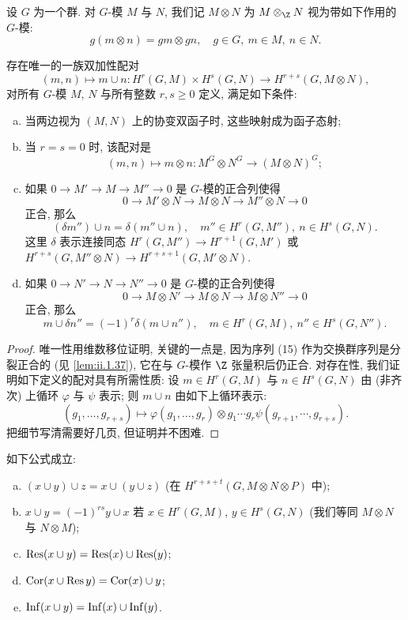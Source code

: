 设 $G$ 为一个群. 对 $G$-模 $M$ 与 $N$, 我们记 $M\otimes N$ 为 $M\otimes_\Z N$ 视为带如下作用的 $G$-模:
\[
 g(m\otimes n)=gm\otimes gn,\quad g\in G,\ m\in M,\ n\in N.
\]

\begin{proposition}\label{prop:ii.1.38}
存在唯一的一族双加性配对
\[
 (m,n)\mapsto m\cup n\colon H^r(G,M)\times H^s(G,N)\to H^{r+s}(G,M\otimes N),
\]
对所有 $G$-模 $M$, $N$ 与所有整数 $r,s\ge 0$ 定义, 满足如下条件:
\begin{enumerate}[(a)]
\item 当两边视为 $(M,N)$ 上的协变双函子时, 这些映射成为函子态射;
\item 当 $r=s=0$ 时, 该配对是
\[
 (m,n)\mapsto m\otimes n\colon M^G\otimes N^G\to (M\otimes N)^G;
\]
\item 如果 $0\to M'\to M\to M''\to 0$ 是 $G$-模的正合列使得
\[
 0\to M'\otimes N\to M\otimes N\to M''\otimes N\to 0
\]
正合, 那么
\[
 (\delta m'')\cup n=\delta(m''\cup n),\quad m''\in H^r(G,M''),\ n\in H^s(G,N).
\]
这里 $\delta$ 表示连接同态 $H^r(G,M'')\to H^{r+1}(G,M')$ 或 $H^{r+s}(G,M''\otimes N)\to H^{r+s+1}(G,M'\otimes N)$.
\item 如果 $0\to N'\to N\to N''\to 0$ 是 $G$-模的正合列使得
\[
 0\to M\otimes N'\to M\otimes N\to M\otimes N''\to 0
\]
正合, 那么
\[
 m\cup \delta n''=(-1)^r\delta(m\cup n''),\quad m\in H^r(G,M),\ n''\in H^s(G,N'').
\]
\end{enumerate}
\end{proposition}

\begin{proof}
唯一性用维数移位证明, 关键的一点是, 因为序列 (15) 作为交换群序列是分裂正合的 (见 \ref{lem:ii.1.37}), 它在与 $G$-模作 $\Z$ 张量积后仍正合. 对存在性, 我们证明如下定义的配对具有所需性质: 设 $m\in H^r(G,M)$ 与 $n\in H^s(G,N)$ 由 (非齐次) 上循环 $\varphi$ 与 $\psi$ 表示; 则 $m\cup n$ 由如下上循环表示:
\[
 (g_1,\ldots,g_{r+s})\mapsto \varphi(g_1,\ldots,g_r)\otimes g_1\cdots g_r\psi(g_{r+1},\cdots,g_{r+s}).
\]
把细节写清需要好几页, 但证明并不困难.
\end{proof}

\begin{proposition}\label{prop:ii.1.39}
如下公式成立:
\begin{enumerate}[(a)]
\item $(x\cup y)\cup z=x\cup (y\cup z)$ (在 $H^{r+s+t}(G,M\otimes N\otimes P)$ 中);
\item $x\cup y=(-1)^{rs}y\cup x$ 若 $x\in H^r(G,M)$, $y\in H^s(G,N)$ (我们等同 $M\otimes N$ 与 $N\otimes M$);
\item $\operatorname{Res}(x\cup y)=\operatorname{Res}(x)\cup \operatorname{Res}(y)$;
\item $\operatorname{Cor}(x\cup \operatorname{Res} y)=\operatorname{Cor}(x)\cup y$;
\item $\operatorname{Inf}(x\cup y)=\operatorname{Inf}(x)\cup \operatorname{Inf}(y)$.
\end{enumerate}
\end{proposition}

